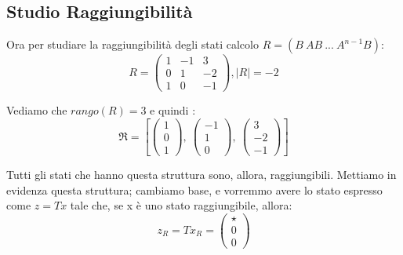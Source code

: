 \documentclass{article}
\begin{document}
\subsection{Studio Raggiungibilità}
Ora per studiare la raggiungibilità degli stati calcolo $R = (B\ AB\ ...\ A^{n-1}B)$: \[ R = \left(\begin{matrix}1 & -1 & 3\\0 & 1 & -2\\1 & 0 & -1\end{matrix}\right), |R| = -2 \] 

Vediamo che $rango(R) = 3$ e quindi : \[ \mathfrak{R} = \left[ \left(\begin{matrix}1\\0\\1\end{matrix}\right), \  \left(\begin{matrix}-1\\1\\0\end{matrix}\right), \  \left(\begin{matrix}3\\-2\\-1\end{matrix}\right)\right] \]

Tutti gli stati che hanno questa struttura sono, allora, raggiungibili. Mettiamo in evidenza questa struttura;
cambiamo base, e vorremmo avere lo stato espresso come $z = Tx$ tale che, se x è uno stato raggiungibile, allora: \[ z_R = T x_R = \begin{pmatrix} \star  \\ 0 \\0\end{pmatrix}\]
\end{document}
